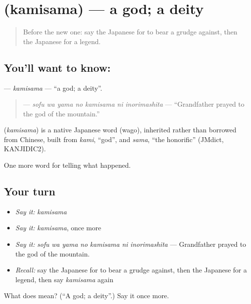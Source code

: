 \section[\texorpdfstring{\ja{かみさま} (kamisama)}{かみさま (kamisama)}]{ (kamisama) — a god; a deity}

\label{lesson:JA-C302-kamisama}



\begin{quote}
Before the new one: say the Japanese for to bear a grudge against, then the Japanese for a legend.
\end{quote}

\subsection*{You'll want to know: }
\textbf{} — \emph{kamisama} — \textquotedblleft{}a god; a deity\textquotedblright{}.

\begin{quote}
\textbf{   } — \emph{sofu wa yama no kamisama ni inorimashita} — \textquotedblleft{}Grandfather prayed to the god of the mountain.\textquotedblright{}
\end{quote}

\begin{cousinweb}
\textbf{} (\emph{kamisama}) is a native Japanese word (wago), inherited rather than borrowed from Chinese, built from \emph{kami}, \textquotedblleft{}god\textquotedblright{}, and \emph{sama}, \textquotedblleft{}the honorific\textquotedblright{} (JMdict, KANJIDIC2).
\end{cousinweb}

\begin{grammarlens}[title={What you've built}]
One more word for telling what happened.
\end{grammarlens}

\subsection*{Your turn}
\begin{itemize}
\raggedright
  \item \emph{Say it:} \emph{kamisama}
  \item \emph{Say it:} \emph{kamisama}, once more
  \item \emph{Say it:} \emph{sofu wa yama no kamisama ni inorimashita} — Grandfather prayed to the god of the mountain.
  \item \emph{Recall:} say the Japanese for to bear a grudge against, then the Japanese for a legend, then say \emph{kamisama} again
\end{itemize}

\begin{tcolorbox}[breakable,colback=teal!4,colframe=teal!35!black,title={Before you move on}]
What does  mean? (\textquotedblleft{}A god; a deity\textquotedblright{}.) Say it once more.
\end{tcolorbox}
